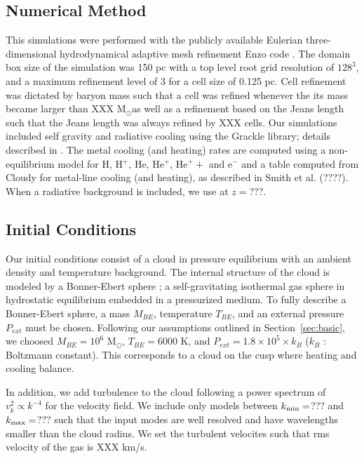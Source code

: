 \documentclass[useAMS,usenatbib]{mn2e}
\newcommand{\msun}{{M$_\odot$}}
\begin{document}
\subsection{Numerical Method}

This simulations were performed with the publicly available Eulerian three-dimensional
hydrodynamical adaptive mesh refinement Enzo code \citep{Bryan2013}. The domain
box size of the simulation was 150 pc with a top level root grid resolution of $128^3$, and
a maximum refinement level of 3 for a cell size of 0.125 pc.  Cell refinement was dictated 
by baryon mass such that a cell was refined whenever the its mass became larger than XXX 
\msun as well as a refinement based on the Jeans length such that the Jeans length was
always refined by XXX cells. 
Our simulations included self gravity and radiative cooling using the
Grackle library; details described in \cite{Bryan2013}. The metal cooling (and
heating) rates are computed using a non-equilibrium model for H, H$^+$, He, He$^+$, He$^++$ and e$^-$
and a table computed from Cloudy for metal-line cooling (and heating), as described in Smith et al. (????).
When a radiative background is included, we use \cite{Haardt2012} at $z=$???.

\subsection{Initial Conditions}
Our initial conditions consist of a cloud in pressure equilibrium with an
ambient density and temperature background. The internal structure of the
cloud is modeled by a Bonner-Ebert sphere \cite{Bonnor1956}; a self-gravitating
isothermal gas sphere in hydrostatic equilibrium embedded in a pressurized  
medium. To fully describe a Bonner-Ebert sphere, a mass $M_{BE}$, temperature
$T_{BE}$, and an external pressure $P_{ext}$ must be chosen. Following our
assumptions outlined in Section~\ref{sec:basic}, we choosed
$M_{BE}=10^6$ \msun, $T_{BE}=6000$ K, and $P_{ext}=1.8\times10^5\times k_B$
($k_B$ : Boltzmann constant). This corresponds to a cloud on the cusp where
heating and cooling balance. 

In addition, we add turbulence to the cloud following a power spectrum of
$v_k^2 \propto k^{-4}$ for the velocity field.  We include only models between
$k_{\rm min}=$??? and $k_{\rm max} = $??? such that the input modes are well resolved
and have wavelengths smaller than the cloud radius.  We set the turbulent velocites
such that rms velocity of the gas is XXX km/s.
\end{document}
